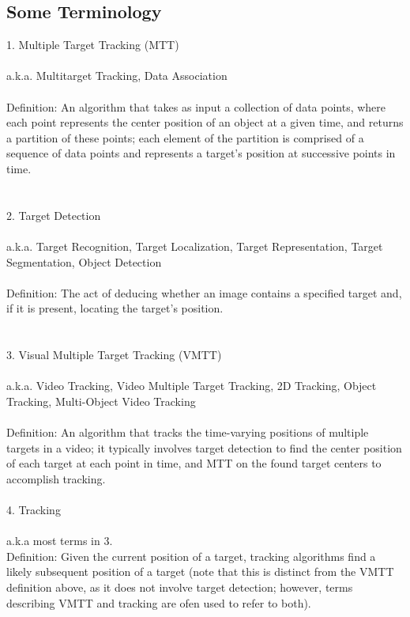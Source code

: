 \documentclass{article}
\begin{document}
\subsection*{Some Terminology}
\vspace{6pt}
1. Multiple Target Tracking (MTT) \\
\\
a.k.a. Multitarget Tracking, Data Association \\
\\
Definition: An algorithm that takes as input a collection of data points, where each point represents the center position of an object at a given time, and returns a partition of these points; each element of the partition is comprised of a sequence of data points and represents a target's position at successive points in time. \\
\\
\\
2. Target Detection \\
\\
a.k.a. Target Recognition, Target Localization, Target Representation, Target Segmentation, Object Detection \\
\\
Definition: The act of deducing whether an image contains a specified target and, if it is present, locating the target's position. \\
\\
\\
3. Visual Multiple Target Tracking (VMTT) \\
\\
a.k.a. Video Tracking, Video Multiple Target Tracking, 2D Tracking, Object Tracking, Multi-Object Video Tracking \\
\\
Definition: An algorithm that tracks the time-varying positions of multiple targets in a video; it typically involves target detection to find the center position of each target at each point in time, and MTT on the found target centers to accomplish tracking.
\\
\\
4. Tracking \\
\\
a.k.a most terms in 3.
\\
Definition: Given the current position of a target, tracking algorithms find a likely subsequent position of a target (note that this is distinct from the VMTT definition above, as it does not involve target detection; however, terms describing VMTT and tracking are ofen used to refer to both).
\end{document}
